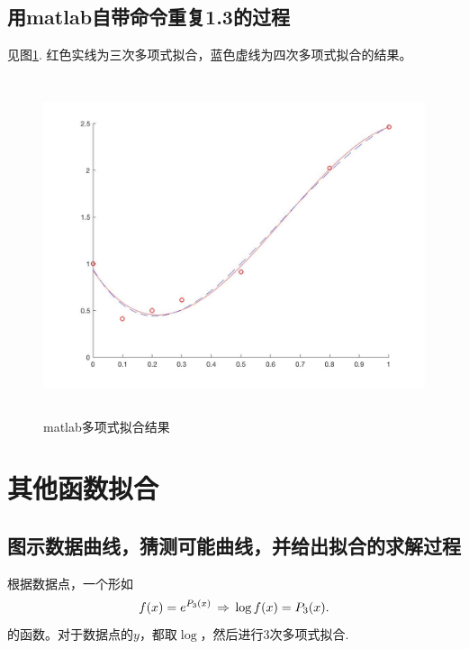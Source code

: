\subsection{用matlab自带命令重复1.3的过程}
  见图\ref{fig: matlab多项式拟合}. 红色实线为三次多项式拟合，蓝色虚线为四次多项式拟合的结果。
  \begin{figure}
    \includegraphics[height=9.9cm]{../image/run_polyfit.jpg}
    \caption{matlab多项式拟合结果}
    \label{fig: matlab多项式拟合}
  \end{figure}
  

\section{其他函数拟合}

\subsection{图示数据曲线，猜测可能曲线，并给出拟合的求解过程}
  根据数据点，一个形如
  \[
    \mathnormal{f}(x) = e^{P_3(x)} \,\Rightarrow\,
    \log\mathnormal{f}(x) = P_3(x).
  \]
  的函数。对于数据点的$y$，都取$\log$，然后进行$3$次多项式拟合.


